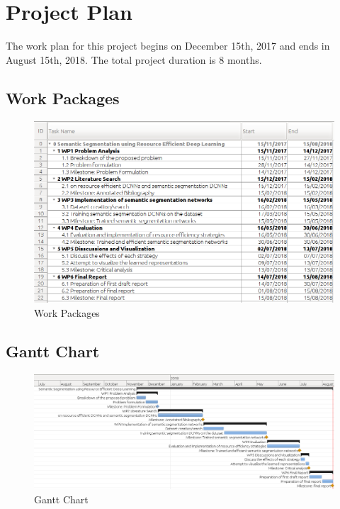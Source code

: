 \documentclass[a4paper,12pt]{article}
\begin{document}
\section{Project Plan}
The work plan for this project begins on December 15th, 2017 and ends in August 15th, 2018. The total project duration is 8 months. 
\subsection{Work Packages}
	\begin{center}
		\begin{figure}[htbp]
			\begin{center}
				\caption{Work Packages}
				\includegraphics[scale=0.325]{workplan.png}
			\end{center}
		\end{figure}
	\end{center}

\newpage
\subsection{Gantt Chart}
	\begin{center}
		\begin{figure}[!htb]
			\begin{center}
				\caption{Gantt Chart}
				\includegraphics[scale=0.25]{gantt_chart.png}
			\end{center}
		\end{figure}
	\end{center}
\end{document}
